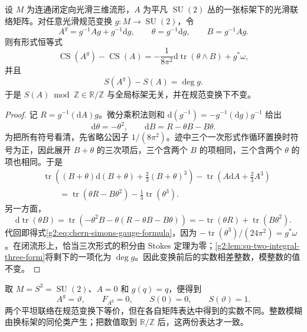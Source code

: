 \begin{theorem}\label{g2:thm:chern-simons-gauge-integer}
	设 \(M\) 为连通闭定向光滑三维流形，\(A\) 为平凡 \(\operatorname{SU}(2)\) 丛的一张标架下的光滑联络矩阵。对任意光滑规范变换 \(g:M\to\operatorname{SU}(2)\)，令
	\[
		A^g=g^{-1}Ag+g^{-1}\mathrm dg,\qquad \theta=g^{-1}\mathrm dg,\qquad B=g^{-1}Ag.
	\]
	则有形式恒等式
	\begin{equation}\label{g2:eq:chern-simons-gauge-formula}
		\operatorname{CS}(A^g)-\operatorname{CS}(A)
		=-\frac1{8\pi^2}\mathrm d\operatorname{tr}(\theta\wedge B)+g^*\omega,
	\end{equation}
	并且
	\begin{equation}\label{g2:eq:chern-simons-integer-shift}
		S(A^g)-S(A)=\deg g.
	\end{equation}
	于是 \(S(A)\bmod\mathbb Z\in\mathbb R/\mathbb Z\) 与全局标架无关，并在规范变换下不变。
\end{theorem}
\begin{proof}
	记 \(R=g^{-1}(\mathrm dA)g\)。微分乘积法则和 \(\mathrm d(g^{-1})=-g^{-1}(\mathrm dg)g^{-1}\) 给出
	\[
		\mathrm d\theta=-\theta^2,\qquad \mathrm dB=R-\theta B-B\theta.
	\]
	为把所有符号看清，先省略公因子 \(1/(8\pi^2)\)。迹中三个一次形式作循环置换时符号为正，因此展开 \(B+\theta\) 的三次项后，三个含两个 \(B\) 的项相同，三个含两个 \(\theta\) 的项也相同。于是
	\[
	\begin{aligned}
		&\operatorname{tr}\left((B+\theta)\mathrm d(B+\theta)+\frac23(B+\theta)^3\right)
		-\operatorname{tr}\left(A\mathrm dA+\frac23A^3\right)\\
		&\qquad=\operatorname{tr}(\theta R-B\theta^2)-\frac13\operatorname{tr}(\theta^3).
	\end{aligned}
	\]
	另一方面，
	\[
		\mathrm d\operatorname{tr}(\theta B)
		=\operatorname{tr}(-\theta^2B-\theta(R-\theta B-B\theta))
		=-\operatorname{tr}(\theta R)+\operatorname{tr}(B\theta^2).
	\]
	代回即得式\eqref{g2:eq:chern-simons-gauge-formula}，因为 \(-\operatorname{tr}(\theta^3)/(24\pi^2)=g^*\omega\)。在闭流形上，恰当三次形式的积分由 Stokes 定理为零；\cref{g2:lem:su-two-integral-three-form}将剩下的一项化为 \(\deg g\)。因此变换前后的实数相差整数，模整数的值不变。
\end{proof}

取 \(M=S^3=\operatorname{SU}(2)\)、\(A=0\) 和 \(g(q)=q\)，便得到
\[
	A^g=\vartheta,\qquad F_{A^g}=0,\qquad S(0)=0,\qquad S(\vartheta)=1.
\]
两个平坦联络在规范变换下等价，但在各自矩阵表达中得到的实数不同。整数模糊由换标架的同伦类产生；把数值取到 \(\mathbb R/\mathbb Z\) 后，这两份表达才一致。


